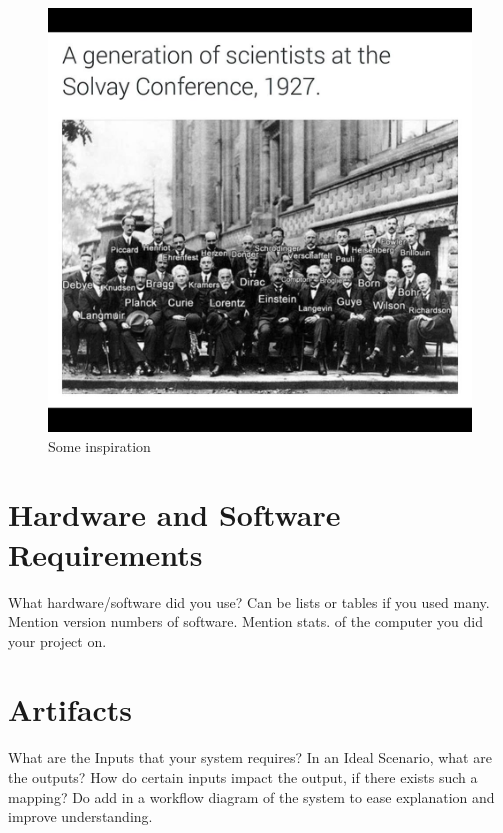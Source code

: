 \documentclass[12pt]{report}
\begin{document}
\begin{figure}[ht]
  \includegraphics[width =\columnwidth]{solvay.jpg}
  \caption{Some inspiration}
  \label{solvay}
\end{figure}

\section{Hardware and Software Requirements}
What hardware/software did you use? Can be lists or tables if you used many. Mention version numbers of software. Mention stats. of the computer you did your project on. 
\section{Artifacts}
What are the Inputs that your system requires? In an Ideal Scenario, what are the outputs? How do certain inputs impact the output, if there exists such a mapping? Do add in a workflow diagram of the system to ease explanation and improve understanding. 
\end{document}
